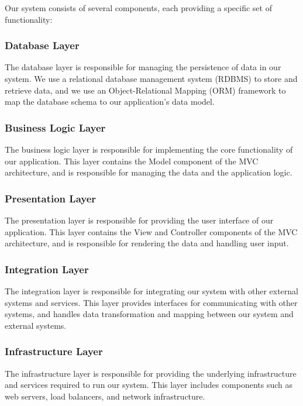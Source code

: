 \documentclass{article}
\begin{document}
Our system consists of several components, each providing a specific set of functionality:

\subsubsection{Database Layer}

The database layer is responsible for managing the persistence of data in our system. We use a relational database management system (RDBMS) to store and retrieve data, and we use an Object-Relational Mapping (ORM) framework to map the database schema to our application's data model.

\subsubsection{Business Logic Layer}

The business logic layer is responsible for implementing the core functionality of our application. This layer contains the Model component of the MVC architecture, and is responsible for managing the data and the application logic.

\subsubsection{Presentation Layer}

The presentation layer is responsible for providing the user interface of our application. This layer contains the View and Controller components of the MVC architecture, and is responsible for rendering the data and handling user input.

\subsubsection{Integration Layer}

The integration layer is responsible for integrating our system with other external systems and services. This layer provides interfaces for communicating with other systems, and handles data transformation and mapping between our system and external systems.

\subsubsection{Infrastructure Layer}

The infrastructure layer is responsible for providing the underlying infrastructure and services required to run our system. This layer includes components such as web servers, load balancers, and network infrastructure.
\end{document}
